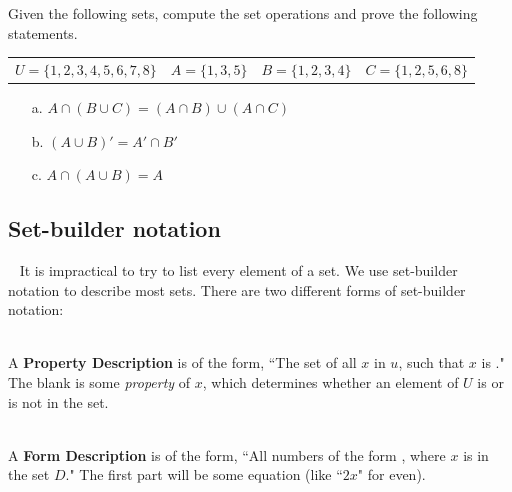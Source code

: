 \documentclass[a4paper,12pt]{book}
\newcounter{question}
\begin{document}
        \begin{questionNOGRADE}{\thequestion}

            Given the following sets, compute the set operations and prove
            the following statements.

            \begin{tabular}{l l l l}
                $U = \{1, 2, 3, 4, 5, 6, 7, 8 \} $ &
                $A = \{1, 3, 5\}$ &
                $B = \{1, 2, 3, 4\}$ &
                $C = \{1, 2, 5, 6, 8\}$
            \end{tabular}

            \begin{enumerate}
                \item[a.]   $A \cap (B \cup C) = (A \cap B) \cup (A \cap C)$
                    \solution{}{ ~\\ \raisebox{0pt}[4cm][0pt]{  } }

                \item[b.]   $(A \cup B)' = A' \cap B'$
                    \solution{}{ ~\\ \raisebox{0pt}[4cm][0pt]{  } }

                \item[c.]   $A \cap (A \cup B) = A$
                    \solution{}{ ~\\ \raisebox{0pt}[4cm][0pt]{  } }
            \end{enumerate}

        \end{questionNOGRADE}

        \newpage

        \subsection{Set-builder notation}

        \begin{intro}{\ }
            It is impractical to try to list every element of a set.
            We use set-builder notation to describe most sets.
            There are two different forms of set-builder notation:

            ~\\
            A \textbf{Property Description} is of the form,
            ``The set of all $x$ in $u$, such that $x$ is \fitb."
            The blank is some \textit{property} of $x$, which
            determines whether an element of $U$ is or is not in the set.

            ~\\
            A \textbf{Form Description} is of the form,
            ``All numbers of the form \fitb, where $x$ is in the set $D$."
            The first part will be some equation (like ``$2x$" for even).
        \end{intro}
\end{document}
